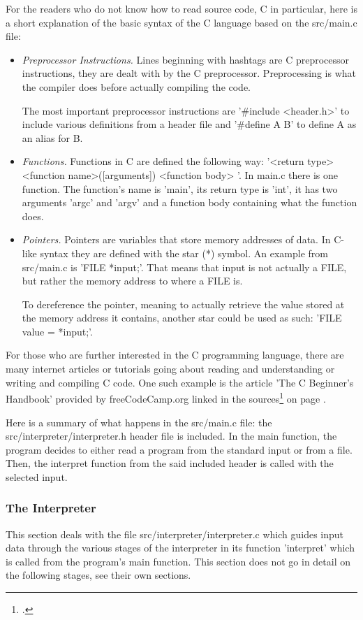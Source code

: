 \documentclass[12pt,a4paper,man]{apa7}
\begin{document}
For the readers who do not know how to read source code, C in particular, here is a short
explanation of the basic syntax of the C language based on the src/main.c file:
\begin{itemize}
    \item \emph{Preprocessor Instructions.} Lines beginning with hashtags are
        C preprocessor instructions, they are dealt with by the C preprocessor.
        Preprocessing is what the compiler does before actually compiling the
        code.

        The most important preprocessor instructions are '\#include <header.h>'
        to include various definitions from a header file and '\#define A B' to
        define A as an alias for B.
    \item \emph{Functions.} Functions in C are defined the following way:
        '<return type> <function name>([arguments]) { <function body> }'.
        In main.c there is one function. The function's name is 'main', its
        return type is 'int', it has two arguments 'argc' and 'argv' and a
        function body containing what the function does.
    \item \emph{Pointers.} Pointers are variables that store memory addresses
        of data. In C-like syntax they are defined with the star (*) symbol.
        An example from src/main.c is 'FILE *input;'. That means that input is not
        actually a FILE, but rather the memory address to where a FILE is.

        To dereference the pointer, meaning to actually retrieve the value stored
        at the memory address it contains, another star could be used as such:
        'FILE value = *input;'.
\end{itemize}

For those who are further interested in the C programming language, there are
many internet articles or tutorials going about reading and understanding or
writing and compiling C code. One such example is the article 'The C Beginner's
Handbook' provided by freeCodeCamp.org linked in the sources\footcite{freeCodeCamp}
on page \pageref{bibliography}.

Here is a summary of what happens in the src/main.c file: the src/interpreter/interpreter.h
header file is included. In the main function, the program decides to either
read a program from the standard input or from a file. Then, the interpret function
from the said included header is called with the selected input.

\subsubsection{The Interpreter}
This section deals with the file src/interpreter/interpreter.c which guides
input data through the various stages of the \name interpreter in its
function 'interpret' which is called from the program's main function.
This section does not go in detail on the following stages, see their own sections.
\end{document}
